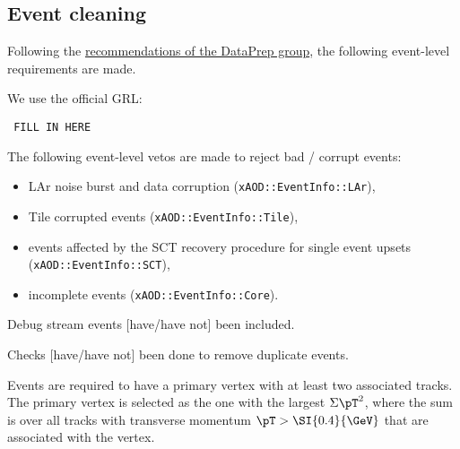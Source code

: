 \subsection{Event cleaning}
Following the \href{https://twiki.cern.ch/twiki/bin/viewauth/Atlas/DataPreparationCheckListForPhysicsAnalysis}{recommendations of the DataPrep group}, the following event-level requirements are made.

We use the official GRL\@:
 \begin{verbatim} FILL IN HERE \end{verbatim}
 
The following event-level vetos are made to reject bad / corrupt events:
 \begin{itemize}
  \item LAr noise burst and data corruption (\verb|xAOD::EventInfo::LAr|),
  \item Tile corrupted events (\verb|xAOD::EventInfo::Tile|),
  \item events affected by the SCT recovery procedure for single event upsets (\verb|xAOD::EventInfo::SCT|),
  \item incomplete events (\verb|xAOD::EventInfo::Core|).
 \end{itemize}
 
 Debug stream events [have/have not] been included.
 
 Checks [have/have not] been done to remove duplicate events.
 
Events are required to have a primary vertex with at least two associated tracks.
The primary vertex is selected as the one with the largest \(\Sigma \pT^2\),
where the sum is over all tracks with transverse momentum \(\pT > \SI{0.4}{\GeV}\) that are associated with the vertex.
 
 